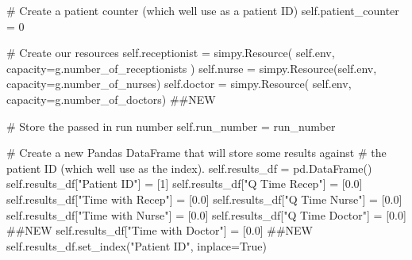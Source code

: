 \documentclass[
  letterpaper,
  DIV=11,
  numbers=noendperiod]{scrreprt}
\newenvironment{Shaded}{\begin{snugshade}}{\end{snugshade}}
\newcommand{\CommentTok}[1]{\textcolor[rgb]{0.37,0.37,0.37}{#1}}
\newcommand{\DecValTok}[1]{\textcolor[rgb]{0.68,0.00,0.00}{#1}}
\newcommand{\FloatTok}[1]{\textcolor[rgb]{0.68,0.00,0.00}{#1}}
\newcommand{\NormalTok}[1]{\textcolor[rgb]{0.00,0.23,0.31}{#1}}
\newcommand{\OperatorTok}[1]{\textcolor[rgb]{0.37,0.37,0.37}{#1}}
\newcommand{\StringTok}[1]{\textcolor[rgb]{0.13,0.47,0.30}{#1}}
\newcommand{\VariableTok}[1]{\textcolor[rgb]{0.07,0.07,0.07}{#1}}
\begin{document}
\begin{tcolorbox}
\begin{Shaded}
\begin{Highlighting}[]
        \CommentTok{\# Create a patient counter (which we\textquotesingle{}ll use as a patient ID)}
        \VariableTok{self}\NormalTok{.patient\_counter }\OperatorTok{=} \DecValTok{0}

        \CommentTok{\# Create our resources}
        \VariableTok{self}\NormalTok{.receptionist }\OperatorTok{=}\NormalTok{ simpy.Resource(}
            \VariableTok{self}\NormalTok{.env, capacity}\OperatorTok{=}\NormalTok{g.number\_of\_receptionists}
\NormalTok{        )}
        \VariableTok{self}\NormalTok{.nurse }\OperatorTok{=}\NormalTok{ simpy.Resource(}\VariableTok{self}\NormalTok{.env, capacity}\OperatorTok{=}\NormalTok{g.number\_of\_nurses)}
        \VariableTok{self}\NormalTok{.doctor }\OperatorTok{=}\NormalTok{ simpy.Resource(}
            \VariableTok{self}\NormalTok{.env, capacity}\OperatorTok{=}\NormalTok{g.number\_of\_doctors) }\CommentTok{\#\#NEW}

        \CommentTok{\# Store the passed in run number}
        \VariableTok{self}\NormalTok{.run\_number }\OperatorTok{=}\NormalTok{ run\_number}

        \CommentTok{\# Create a new Pandas DataFrame that will store some results against}
        \CommentTok{\# the patient ID (which we\textquotesingle{}ll use as the index).}
        \VariableTok{self}\NormalTok{.results\_df }\OperatorTok{=}\NormalTok{ pd.DataFrame()}
        \VariableTok{self}\NormalTok{.results\_df[}\StringTok{"Patient ID"}\NormalTok{] }\OperatorTok{=}\NormalTok{ [}\DecValTok{1}\NormalTok{]}
        \VariableTok{self}\NormalTok{.results\_df[}\StringTok{"Q Time Recep"}\NormalTok{] }\OperatorTok{=}\NormalTok{ [}\FloatTok{0.0}\NormalTok{]}
        \VariableTok{self}\NormalTok{.results\_df[}\StringTok{"Time with Recep"}\NormalTok{] }\OperatorTok{=}\NormalTok{ [}\FloatTok{0.0}\NormalTok{]}
        \VariableTok{self}\NormalTok{.results\_df[}\StringTok{"Q Time Nurse"}\NormalTok{] }\OperatorTok{=}\NormalTok{ [}\FloatTok{0.0}\NormalTok{]}
        \VariableTok{self}\NormalTok{.results\_df[}\StringTok{"Time with Nurse"}\NormalTok{] }\OperatorTok{=}\NormalTok{ [}\FloatTok{0.0}\NormalTok{]}
        \VariableTok{self}\NormalTok{.results\_df[}\StringTok{"Q Time Doctor"}\NormalTok{] }\OperatorTok{=}\NormalTok{ [}\FloatTok{0.0}\NormalTok{] }\CommentTok{\#\#NEW}
        \VariableTok{self}\NormalTok{.results\_df[}\StringTok{"Time with Doctor"}\NormalTok{] }\OperatorTok{=}\NormalTok{ [}\FloatTok{0.0}\NormalTok{] }\CommentTok{\#\#NEW}
        \VariableTok{self}\NormalTok{.results\_df.set\_index(}\StringTok{"Patient ID"}\NormalTok{, inplace}\OperatorTok{=}\VariableTok{True}\NormalTok{)}


\end{Highlighting}
\end{Shaded}
\end{tcolorbox}
\end{document}
